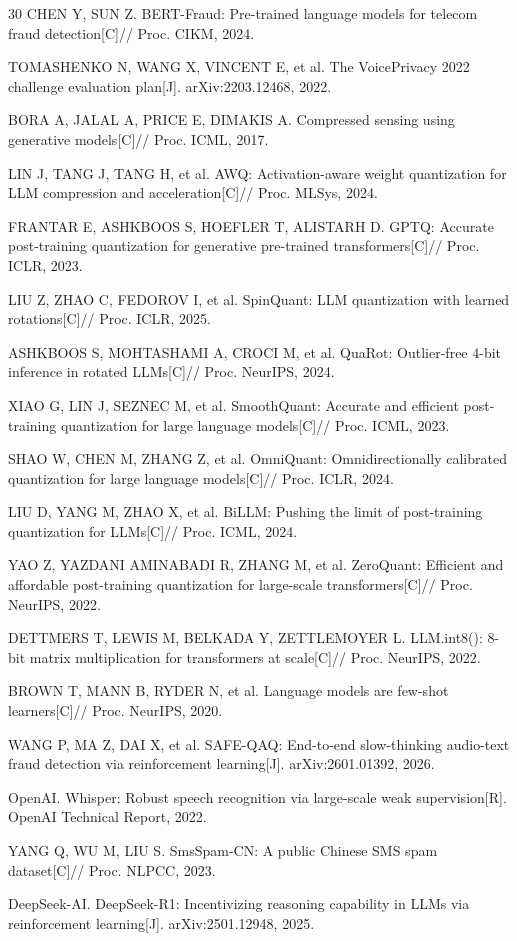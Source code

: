 \documentclass[UTF8,a4paper,10pt,twocolumn]{ctexart}
\theoremstyle{plain}
\begin{document}
\begin{thebibliography}{30}
CHEN Y, SUN Z.
BERT-Fraud: Pre-trained language models for telecom fraud detection[C]//
Proc. CIKM, 2024.

TOMASHENKO N, WANG X, VINCENT E, et al.
The VoicePrivacy 2022 challenge evaluation plan[J].
arXiv:2203.12468, 2022.

BORA A, JALAL A, PRICE E, DIMAKIS A.
Compressed sensing using generative models[C]//
Proc. ICML, 2017.

LIN J, TANG J, TANG H, et al.
AWQ: Activation-aware weight quantization for LLM compression and acceleration[C]//
Proc. MLSys, 2024.

FRANTAR E, ASHKBOOS S, HOEFLER T, ALISTARH D.
GPTQ: Accurate post-training quantization for generative pre-trained transformers[C]//
Proc. ICLR, 2023.

LIU Z, ZHAO C, FEDOROV I, et al.
SpinQuant: LLM quantization with learned rotations[C]//
Proc. ICLR, 2025.

ASHKBOOS S, MOHTASHAMI A, CROCI M, et al.
QuaRot: Outlier-free 4-bit inference in rotated LLMs[C]//
Proc. NeurIPS, 2024.

XIAO G, LIN J, SEZNEC M, et al.
SmoothQuant: Accurate and efficient post-training quantization for large language models[C]//
Proc. ICML, 2023.

SHAO W, CHEN M, ZHANG Z, et al.
OmniQuant: Omnidirectionally calibrated quantization for large language models[C]//
Proc. ICLR, 2024.

LIU D, YANG M, ZHAO X, et al.
BiLLM: Pushing the limit of post-training quantization for LLMs[C]//
Proc. ICML, 2024.

YAO Z, YAZDANI AMINABADI R, ZHANG M, et al.
ZeroQuant: Efficient and affordable post-training quantization for large-scale transformers[C]//
Proc. NeurIPS, 2022.

DETTMERS T, LEWIS M, BELKADA Y, ZETTLEMOYER L.
LLM.int8(): 8-bit matrix multiplication for transformers at scale[C]//
Proc. NeurIPS, 2022.

BROWN T, MANN B, RYDER N, et al.
Language models are few-shot learners[C]//
Proc. NeurIPS, 2020.

WANG P, MA Z, DAI X, et al.
SAFE-QAQ: End-to-end slow-thinking audio-text fraud detection via reinforcement learning[J].
arXiv:2601.01392, 2026.

OpenAI.
Whisper: Robust speech recognition via large-scale weak supervision[R].
OpenAI Technical Report, 2022.

YANG Q, WU M, LIU S.
SmsSpam-CN: A public Chinese SMS spam dataset[C]//
Proc. NLPCC, 2023.

DeepSeek-AI.
DeepSeek-R1: Incentivizing reasoning capability in LLMs via reinforcement learning[J].
arXiv:2501.12948, 2025.

\end{thebibliography}
\end{document}
